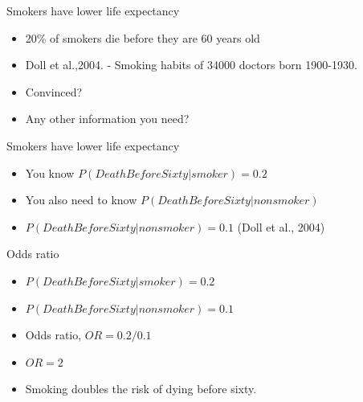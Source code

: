 \documentclass{beamer}
\begin{document}
\begin{frame}{Smokers have lower life expectancy}
\begin{itemize}

\item 20\% of smokers die before they are 60 years old 
\item Doll et al.,2004. - Smoking habits of 34000 doctors born 1900-1930.

\item Convinced?
\item Any other information you need?
\end{itemize}
\end{frame}

\begin{frame}{Smokers have lower life expectancy}
\begin{itemize}

\item You know $P(DeathBeforeSixty|smoker) = 0.2 $ 
\item You also need to know $P(DeathBeforeSixty|nonsmoker)$ 
\item $P(DeathBeforeSixty|nonsmoker) = 0.1 $ (Doll et al., 2004)
\end{itemize}
\end{frame}

\begin{frame}{Odds ratio}
\begin{itemize}

\item $P(DeathBeforeSixty|smoker) = 0.2 $ 
\item $P(DeathBeforeSixty|nonsmoker) = 0.1 $ 
\item Odds ratio, $OR = 0.2 / 0.1 $
\item $OR = 2$
\item Smoking doubles the risk of dying before sixty. 
\end{itemize}
\end{frame}
\end{document}
